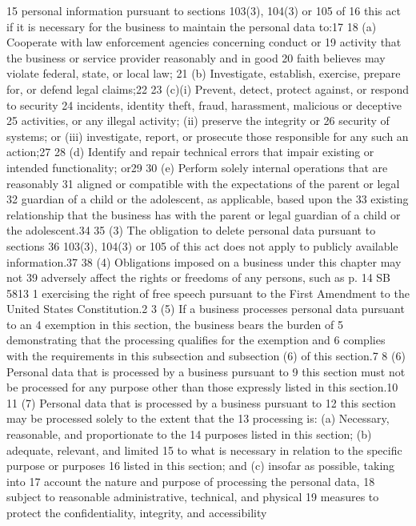 15 personal information pursuant to sections 103(3), 104(3) or 105 of
16 this act if it is necessary for the business to maintain the personal
data to:17
18 (a) Cooperate with law enforcement agencies concerning conduct or
19 activity that the business or service provider reasonably and in good
20 faith believes may violate federal, state, or local law;
21 (b) Investigate, establish, exercise, prepare for, or defend
legal claims;22
23 (c)(i) Prevent, detect, protect against, or respond to security
24 incidents, identity theft, fraud, harassment, malicious or deceptive
25 activities, or any illegal activity; (ii) preserve the integrity or
26 security of systems; or (iii) investigate, report, or prosecute those
responsible for any such an action;27
28 (d) Identify and repair technical errors that impair existing or
intended functionality; or29
30 (e) Perform solely internal operations that are reasonably
31 aligned or compatible with the expectations of the parent or legal
32 guardian of a child or the adolescent, as applicable, based upon the
33 existing relationship that the business has with the parent or legal
guardian of a child or the adolescent.34
35 (3) The obligation to delete personal data pursuant to sections
36 103(3), 104(3) or 105 of this act does not apply to publicly
available information.37
38 (4) Obligations imposed on a business under this chapter may not
39 adversely affect the rights or freedoms of any persons, such as
p. 14 SB 5813
1 exercising the right of free speech pursuant to the First Amendment
to the United States Constitution.2
3 (5) If a business processes personal data pursuant to an
4 exemption in this section, the business bears the burden of
5 demonstrating that the processing qualifies for the exemption and
6 complies with the requirements in this subsection and subsection (6)
of this section.7
8 (6) Personal data that is processed by a business pursuant to
9 this section must not be processed for any purpose other than those
expressly listed in this section.10
11 (7) Personal data that is processed by a business pursuant to
12 this section may be processed solely to the extent that the
13 processing is: (a) Necessary, reasonable, and proportionate to the
14 purposes listed in this section; (b) adequate, relevant, and limited
15 to what is necessary in relation to the specific purpose or purposes
16 listed in this section; and (c) insofar as possible, taking into
17 account the nature and purpose of processing the personal data,
18 subject to reasonable administrative, technical, and physical
19 measures to protect the confidentiality, integrity, and accessibility
